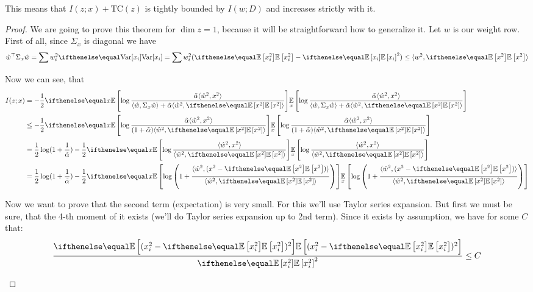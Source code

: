 \documentclass{article}
\begin{document}
This means that $I(z;x) + \text{TC}(z)$ is tightly bounded by $I(w;D)$ and increases strictly with it.

\begin{proof}
We are going to prove this theorem for $\dim z = 1$, because it will be straightforward how to generalize it.
Let $w$ is our weight row.
First of all, since $\Sigma_x$ is diagonal we have
\[
\hat{w}^\top \Sigma_x \hat{w} = \sum w_i^2 \var{x_i} = \sum w_i^2 (\expect{x_i^2} - \expect{x_i}^2) \leq \langle w^2, \expect{x^2} \rangle
\]

Now we can see, that
\begin{equation}
\begin{split}
I(z;x)
&= -\frac{1}{2}\expect[x]{\log \frac{\tilde \alpha \langle \hat w^2, x^2 \rangle }{\langle \hat w, \Sigma_x \hat w \rangle + \tilde \alpha \langle \hat w^2, \expect{x^2} \rangle}}
\\
&\leq -\frac{1}{2}\expect[x]{\log \frac{\tilde \alpha \langle \hat w^2, x^2 \rangle }{(1 + \tilde \alpha) \langle \hat w^2, \expect{x^2} \rangle}}
\\
&= \frac{1}{2}\log(1 + \frac{1}{\tilde\alpha}) - \frac{1}{2}\expect[x]{\log \frac{\langle \hat w^2, x^2 \rangle }{\langle \hat w^2, \expect{x^2} \rangle}}
\\
&= \frac{1}{2}\log(1 + \frac{1}{\tilde\alpha}) - \frac{1}{2}\expect[x]{\log \left(1 + \frac{\langle \hat w^2, (x^2 - \expect{x^2}) \rangle }{\langle \hat w^2, \expect{x^2} \rangle}\right)}
\end{split}
\end{equation}

Now we want to prove that the second term (expectation) is very small.
For this we'll use Taylor series expansion.
But first we must be sure, that the 4-th moment of it exists (we'll do Taylor series expansion up to 2nd term).
Since it exists by assumption, we have for some $C$ that:
\[
\frac{\expect{(x_i^2 - \expect{x_i^2})^2}}{\expect{x_i^2}^2} \leq C
\]


\end{proof}
\end{document}
